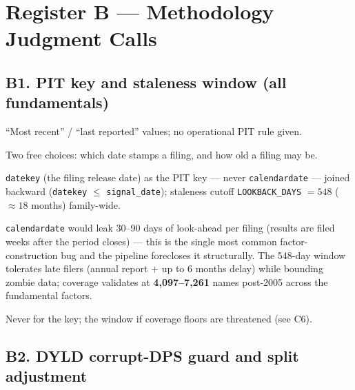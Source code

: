 \documentclass[11pt,a4paper]{article}
\begin{document}
\section{Register B --- Methodology Judgment Calls}

\subsection{B1. PIT key and staleness window (all fundamentals)}

\begin{description}[style=nextline]
  \item[USE4] ``Most recent'' / ``last reported'' values; no operational PIT
    rule given.
  \item[Deviation] Two free choices: which date stamps a filing, and how old a
    filing may be.
  \item[Solution] \texttt{datekey} (the filing release date) as the PIT key ---
    never \texttt{calendardate} --- joined backward
    (\texttt{datekey} $\leq$ \texttt{signal\_date}); staleness cutoff
    \texttt{LOOKBACK\_DAYS} $=548$ ($\approx 18$ months) family-wide.
  \item[Validity] \texttt{calendardate} would leak 30--90 days of look-ahead
    per filing (results are filed weeks after the period closes) --- this is
    the single most common factor-construction bug and the pipeline forecloses
    it structurally. The 548-day window tolerates late filers (annual report
    $+$ up to 6 months delay) while bounding zombie data; coverage validates at
    \textbf{4{,}097--7{,}261} names post-2005 across the fundamental factors.
  \item[Revisit when] Never for the key; the window if coverage floors are
    threatened (see C6).
\end{description}

\subsection{B2. DYLD corrupt-DPS guard and split adjustment}
\end{document}
